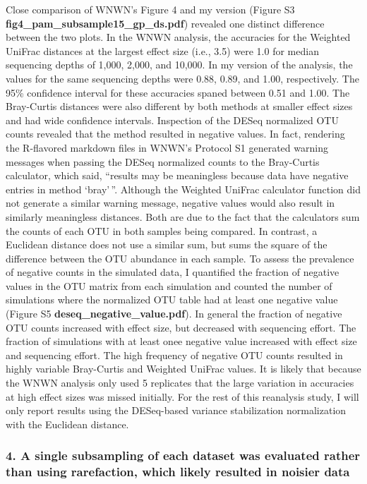 \documentclass[
]{article}
\begin{document}
Close comparison of WNWN's Figure 4 and my version (Figure S3
\textbf{fig4\_pam\_subsample15\_gp\_ds.pdf}) revealed one distinct
difference between the two plots. In the WNWN analysis, the accuracies
for the Weighted UniFrac distances at the largest effect size (i.e.,
3.5) were 1.0 for median sequencing depths of 1,000, 2,000, and 10,000.
In my version of the analysis, the values for the same sequencing depths
were 0.88, 0.89, and 1.00, respectively. The 95\% confidence interval
for these accuracies spaned between 0.51 and 1.00. The Bray-Curtis
distances were also different by both methods at smaller effect sizes
and had wide confidence intervals. Inspection of the DESeq normalized
OTU counts revealed that the method resulted in negative values. In
fact, rendering the R-flavored markdown files in WNWN's Protocol S1
generated warning messages when passing the DESeq normalized counts to
the Bray-Curtis calculator, which said, ``results may be meaningless
because data have negative entries in method `bray'\,''. Although the
Weighted UniFrac calculator function did not generate a similar warning
message, negative values would also result in similarly meaningless
distances. Both are due to the fact that the calculators sum the counts
of each OTU in both samples being compared. In contrast, a Euclidean
distance does not use a similar sum, but sums the square of the
difference between the OTU abundance in each sample. To assess the
prevalence of negative counts in the simulated data, I quantified the
fraction of negative values in the OTU matrix from each simulation and
counted the number of simulations where the normalized OTU table had at
least one negative value (Figure S5
\textbf{deseq\_negative\_value.pdf}). In general the fraction of
negative OTU counts increased with effect size, but decreased with
sequencing effort. The fraction of simulations with at least onee
negative value increased with effect size and sequencing effort. The
high frequency of negative OTU counts resulted in highly variable
Bray-Curtis and Weighted UniFrac values. It is likely that because the
WNWN analysis only used 5 replicates that the large variation in
accuracies at high effect sizes was missed initially. For the rest of
this reanalysis study, I will only report results using the DESeq-based
variance stabilization normalization with the Euclidean distance.

\hypertarget{a-single-subsampling-of-each-dataset-was-evaluated-rather-than-using-rarefaction-which-likely-resulted-in-noisier-data}{%
\subsubsection{4. A single subsampling of each dataset was evaluated
rather than using rarefaction, which likely resulted in noisier
data}\label{a-single-subsampling-of-each-dataset-was-evaluated-rather-than-using-rarefaction-which-likely-resulted-in-noisier-data}}
\end{document}
